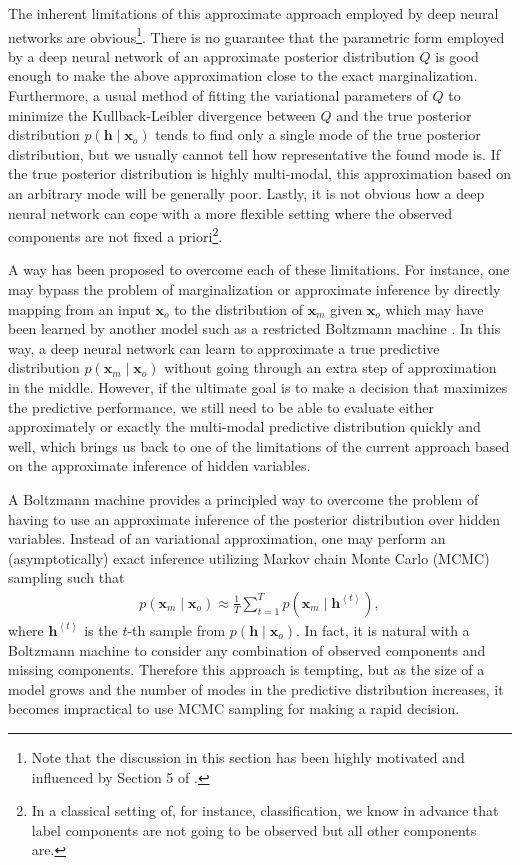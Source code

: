 \documentclass[dissertation,nocontribution,draft*]{aaltoseries}
\newcommand{\qt}[1]{\left<#1\right>}
\newcommand{\vect}[1]{\mathbf{#1}}
\newcommand{\vh}[0]{\vect{h}}
\newcommand{\vx}[0]{\vect{x}}
\begin{document}
The inherent limitations of this approximate approach
employed by deep neural networks are obvious\footnote{Note
that the discussion in this section has been highly
motivated and influenced by Section 5 of
\citep{Bengio2013future}.}. There is no guarantee that the
parametric form employed by a deep neural network of an
approximate posterior distribution $Q$ is good enough to
make the above approximation close to the exact
marginalization.  Furthermore, a usual method of fitting the
variational parameters of $Q$ to minimize the
Kullback-Leibler divergence between $Q$ and the true
posterior distribution $p(\vh \mid \vx_o)$ tends to find
only a single mode of the true posterior distribution, but
we usually cannot tell how representative the found mode is.
If the true posterior distribution is highly multi-modal,
this approximation based on an arbitrary mode will be
generally poor.  Lastly, it is not obvious how a deep neural
network can cope with a more flexible setting where the
observed components are not fixed a priori\footnote{In a
classical setting of, for instance, classification, we know
in advance that label components are not going to be
observed but all other components are.}. 

A way has been proposed to overcome each of these
limitations. For instance, one may bypass the problem of
marginalization or approximate inference by directly mapping
from an input $\vx_o$ to the distribution of $\vx_m$ given
$\vx_o$ which may have been learned by another model such as
a restricted Boltzmann machine \citep{Mnih2011}. In this
way, a deep neural network can learn to approximate a true
predictive distribution $p(\vx_m \mid \vx_o)$ without going
through an extra step of approximation in the middle.
However, if the ultimate goal is to make a decision that
maximizes the predictive performance, we still need to be
able to evaluate either approximately or exactly the
multi-modal predictive distribution quickly and well, which
brings us back to one of the limitations of the current
approach based on the approximate inference of hidden
variables.

A Boltzmann machine provides a principled way to overcome
the problem of having to use an approximate inference of the
posterior distribution over hidden variables. Instead of an
variational approximation, one may perform an
(asymptotically) exact inference utilizing Markov chain
Monte Carlo (MCMC) sampling such that
\begin{align*}
    p(\vx_m \mid \vx_o) \approx \frac{1}{T} \sum_{t=1}^T
    p(\vx_m \mid \vh^{\qt{t}}),
\end{align*}
where $\vh^{\qt{t}}$ is the $t$-th sample from $p(\vh \mid
\vx_o)$. In fact, it is natural with a Boltzmann machine to
consider any combination of observed components and missing
components. Therefore this approach is tempting, but as the
size of a model grows and the number of modes in the
predictive distribution increases, it becomes impractical to
use MCMC sampling for making a rapid decision.
\end{document}

